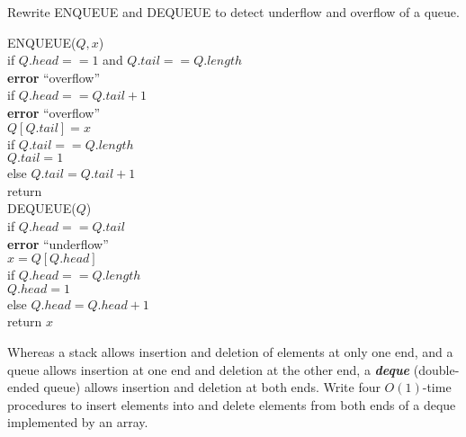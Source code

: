 \documentclass[12pt, a4paper, UTF8]{ctexart}
\begin{document}
\begin{problem}[TC: 10.1-4]
  Rewrite ENQUEUE and DEQUEUE to detect underflow and overflow of a queue.
\end{problem}

\begin{solution}
  ENQUEUE($Q,x$)\\
  \indent if $Q.head == 1$ and $Q.tail == Q.length$\\
  \indent\indent \textbf{error} ``overflow''\\
  \indent if $Q.head == Q.tail + 1$\\
  \indent\indent \textbf{error} ``overflow''\\
  \indent $Q[Q.tail] = x$\\
  \indent if $Q.tail == Q.length$\\
  \indent\indent $Q.tail = 1$\\
  \indent else $Q.tail = Q.tail + 1$\\
  \indent return\\
  DEQUEUE($Q$)\\
  \indent if $Q.head == Q.tail$\\
  \indent\indent \textbf{error} ``underflow''\\
  \indent $x = Q[Q.head]$\\
  \indent if $Q.head == Q.length$\\
  \indent\indent $Q.head = 1$\\
  \indent else $Q.head = Q.head + 1$\\
  \indent return $x$
\end{solution}
\begin{problem}[TC: 10.1-5]
  Whereas a stack allows insertion and deletion of elements at only one end, and 
  a queue allows insertion at one end and deletion at the other end, a \textsl{\textbf{deque}} 
  (double-ended queue) allows insertion and deletion at both ends. Write four 
  $O(1)$-time procedures to insert elements into and delete elements from both 
  ends of a deque implemented by an array.
\end{problem}

\end{document}
